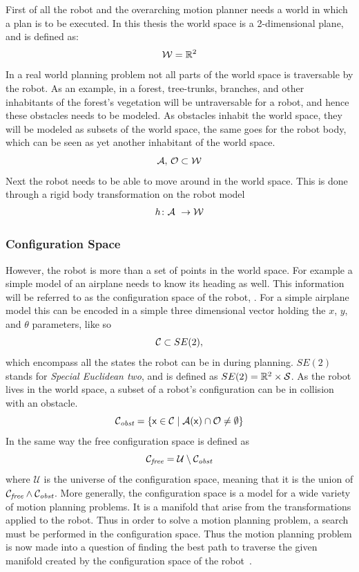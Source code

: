 First of all the robot and the overarching motion planner needs a world in which
a plan is to be executed. In this thesis the world space is a 2-dimensional
plane, and is defined as:
\[
  \mathcal{W} = \mathbb{R}^2
\]
In a real world planning problem not all parts of the world space is traversable
by the robot. As an example, in a forest, tree-trunks, branches, and other
inhabitants of the forest's vegetation will be untraversable for a robot, and
hence these obstacles needs to be modeled. As obstacles inhabit the world space,
they will be modeled as subsets of the world space, the same goes for the robot
body, which can be seen as yet another inhabitant of the world space.
\[
  \mathcal{A},\, \mathcal{O} \subset \mathcal{W}
\]
Next the robot needs to be able to move around in the world space. This is done
through a rigid body transformation on the robot model
\[
  h \colon \modelrobot\ \rightarrow \modelworld
\]


\subsubsection{Configuration Space}

However, the robot is more than a set of points in the world space. For example
a simple model of an airplane needs to know its heading as well. This
information will be referred to as the configuration space of the robot,
\modelconfigurationspace. For a simple airplane model this can be encoded in a
simple three dimensional vector holding the \(x\), \(y\), and \(\theta\)
parameters, like so
\[
  \mathcal{C} \subset SE(2),
\]
which encompass all the states the robot can be in during planning. \(SE(2)\)
stands for \textit{Special Euclidean two}, and is defined as \(SE(2) = \mathbb{R}^2
\times \mathcal{S}\). As the robot lives in the world space, a subset of a
robot's configuration can be in collision with an obstacle.
\[
  \mathcal{C}_{\textit{obst}}{} = \lbrace{\mathbf{\mathsf{x}}} \in \mathcal{C}{} \mid
    \mathcal{A}({\mathbf{\mathsf{x}}}) \cap \mathcal{O}{} \neq \emptyset\rbrace
\]
In the same way the free configuration space is defined as
\[
  \mathcal{C}_{\textit{free}}{} = \mathcal{U} \setminus
  \mathcal{C}_{\textit{obst}}{}
\]
where \(\mathcal{U}\) is the universe of the configuration space, meaning that
it is the union of \(\mathcal{C}_{\textit{free}} \wedge
\mathcal{C}_{\textit{obst}}\). More generally, the configuration space is a
model for a wide variety of motion planning problems. It is a manifold that
arise from the transformations applied to the robot. Thus in order to solve a
motion planning problem, a search must be performed in the configuration space.
Thus the motion planning problem is now made into a question of finding the best
path to traverse the given manifold created by the configuration space of the
robot~\cite{Lav06}.

